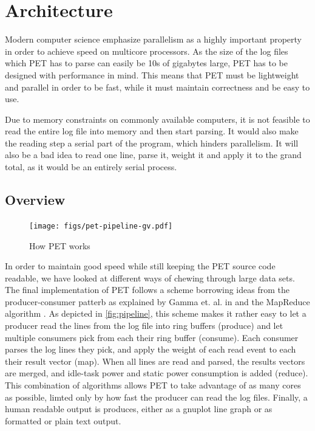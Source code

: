 \section{Architecture}

Modern computer science emphasize parallelism as a highly important property in
order to achieve speed on multicore processors. As the size of the log files
which PET has to parse can easily be 10s of gigabytes large, PET has to be
designed with performance in mind. This means that PET must be lightweight and
parallel in order to be fast, while it must maintain correctness and be easy to
use.

Due to memory constraints on commonly available computers, it is not feasible to
read the entire log file into memory and then start parsing. It would also make
the reading step a serial part of the program, which hinders parallelism. It
will also be a bad idea to read one line, parse it, weight it and apply it to
the grand total, as it would be an entirely serial process.

\subsection{Overview}

\begin{figure}[ht]
    \texttt{[image: figs/pet-pipeline-gv.pdf]}
    \caption{How PET works}
    \label{fig:pipeline}
\end{figure}

In order to maintain good speed while still keeping the PET source code
readable, we have looked at different ways of chewing through large data sets.
The final implementation of PET follows a scheme borrowing ideas from the
producer-consumer patterb as explained by Gamma et. al. in \cite{designpatterns}
and the MapReduce algorithm \cite{dean2008mapreduce}. As depicted in
\autoref{fig:pipeline}, this scheme makes it rather easy to let a producer read
the lines from the log file into ring buffers (produce) and let multiple
consumers pick from each their ring buffer (consume). Each consumer parses the log
lines they pick, and apply the weight of each read event to each their result
vector (map). When all lines are read and parsed, the results vectors are
merged, and idle-task power and static power consumption is added (reduce). This
combination of algorithms allows PET to take advantage of as many cores as
possible, limted only by how fast the producer can read the log files. Finally,
a human readable output is produces, either as a gnuplot line graph or as
formatted or plain text output.

